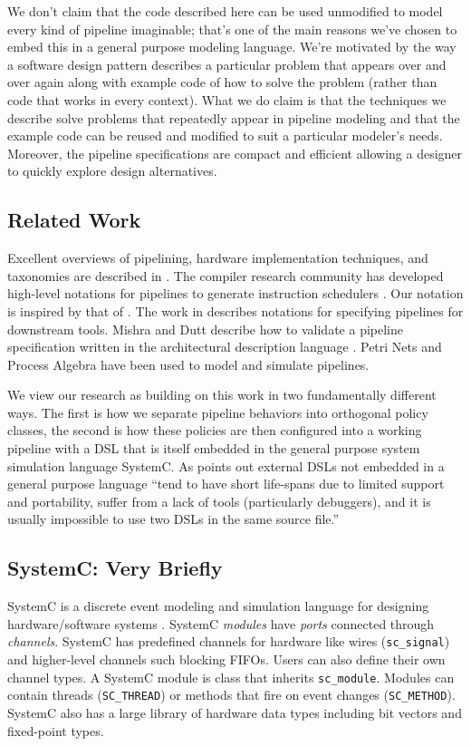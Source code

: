 \documentclass{entcs}
\begin{document}
We don't claim that the code described here can be used unmodified to model every kind
of pipeline imaginable; that's one of the main reasons we've chosen to embed this in a
general purpose modeling language.  We're motivated by the way a
software design pattern \cite{gof} describes a particular problem that appears over and over
again along with example code
of how to solve the problem (rather than code that works in every context). What we do claim is
that the techniques we describe solve problems that repeatedly appear in pipeline modeling
and that the example code can be reused and modified to suit a particular modeler's needs. Moreover,
the pipeline specifications are compact and efficient allowing a designer to quickly
explore design alternatives.

\subsection{Related Work}
Excellent overviews of pipelining, hardware implementation techniques, and taxonomies are described
in \cite{kogge81,hwang84}.
The compiler research community has developed high-level notations for pipelines to
generate instruction schedulers \cite{bradlee91,Proebsting94}. Our notation
is inspired by that of \cite{Proebsting94}. The work
in \cite{AagaardL93,higgins05,hoffman02} describes notations for specifying pipelines
for downstream tools. Mishra and Dutt \cite{MishraDutt} describe how to validate a pipeline
specification written in the architectural description language \cite{expression}.
Petri Nets \cite {reshadiDuttDate05} and Process Algebra \cite{HarcourtDATE,HarcourtSAS}
have been used to model and simulate pipelines.

We view our research as building on this work in two fundamentally different ways. The first is how
we separate pipeline behaviors into orthogonal policy classes, the second is how these policies are
then configured into a working pipeline with a DSL that is itself embedded in the general purpose
system simulation language SystemC. As \cite{veldhuizen99} points out
external DSLs not embedded in a general purpose language ``tend to have short life-spans due to
limited support and portability, suffer from a lack of tools (particularly debuggers), and it is
usually impossible to use two DSLs in the same source file.''

\subsection{SystemC: Very Briefly}
SystemC is a discrete event modeling and simulation language for designing hardware/software systems
\cite{systemc:lrm,systemc:home}.
SystemC {\em modules} have {\em ports} connected through {\em channels}. SystemC has predefined
channels for hardware like wires ({\tt sc\_signal}) and higher-level channels  such blocking FIFOs.
Users can also define their own channel types. A SystemC module is class
that inherits {\tt sc\_module}. Modules can contain threads ({\tt SC\_THREAD}) or methods
that fire on event changes ({\tt SC\_METHOD}).
SystemC also has a large library of hardware data types including bit vectors and fixed-point types.
\end{document}
